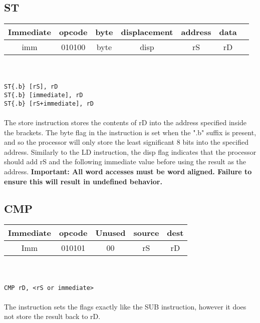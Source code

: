\documentclass{article}
\newcommand{\instrr}[2]{
\subsection{#1}
	\begin{tabular}{| c | c | c  | c | c |}
	\hline
	Immediate & opcode & Unused & source & dest \\ \hline
	Imm & #2 & 00 & rS & rD \\
	\hline
	\end{tabular} \\ \\
	\noindent
	\texttt{#1  rD, \textless rS or immediate\textgreater \\ \\}
}
\begin{document}
	\subsection{ST}
	\begin{tabular}{|c | c | c | c | c | c | c |}
	\hline
	Immediate & opcode & byte & displacement & address & data \\ \hline
	imm & 010100 & byte & disp & rS & rD \\ \hline
	\end{tabular}\noindent \\ \\
	\texttt{ST\{.b\} [rS], rD\\ ST\{.b\} [immediate], rD \\ ST\{.b\} [rS+immediate], rD\\ \\}
	The store instruction stores the contents of rD into the address specified inside the brackets. The byte flag in the instruction is set when the ".b" suffix is present, and so the processor will only store the least significant 8 bits into the specified address. Similarly to the LD instruction, the disp flag indicates that the processor should add rS and the following immediate value before using the result as the address. \textbf{Important: All word accesses must be word aligned. Failure to ensure this will result in undefined behavior. }
	\instrr{CMP}{010101}\noindent
	The instruction sets the flags exactly like the SUB instruction, however it does not store the result back to rD.
\end{document}
